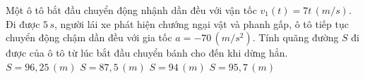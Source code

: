 \begin{ex}%
    Một ô tô bắt đầu chuyển động nhậnh dần đều với vận tốc $v_1\left(t \right)=7t\,\left(m/s \right)$. Đi được $5\,s$, người lái xe phát hiện chướng ngại vật và phanh gấp, ô tô tiếp tục chuyển động chậm dần đều với gia tốc $a=-70\,\left(m/s^2 \right)$. Tính quãng đường $S$ đi được của ô tô từ lúc bắt đầu chuyển bánh cho đến khi dừng hẳn.
    \choice
    {\True $S=96{,}25\,\left(m\right)$}
    {$S=87{,}5\,\left(m\right)$}
    {$S=94\,\left(m\right)$}
    {$S=95{,}7\,\left(m\right)$}
\end{ex}


